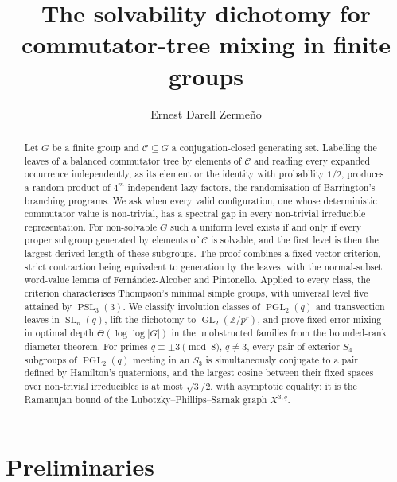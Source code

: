 \documentclass[11pt]{amsart}
\title[The solvability dichotomy for commutator-tree mixing]
{The solvability dichotomy for commutator-tree mixing in finite groups}
\author{Ernest Darell Zermeño}
\theoremstyle{definition}
\theoremstyle{remark}
\theoremstyle{plain}
\theoremstyle{plain}
\numberwithin{equation}{section}
\DeclareMathOperator{\GL}{GL}
\DeclareMathOperator{\SL}{SL}
\DeclareMathOperator{\PGL}{PGL}
\DeclareMathOperator{\PSL}{PSL}
\newcommand{\Z}{\mathbb{Z}}
\begin{document}
\begin{abstract}
Let $G$ be a finite group and $\mathcal C\subseteq G$ a
conjugation-closed generating set. Labelling the leaves of a balanced
commutator tree by elements of $\mathcal C$ and reading every expanded
occurrence independently, as its element or the identity with
probability $1/2$, produces a random product of $4^m$ independent lazy
factors, the randomisation of Barrington's branching programs. We ask
when every valid configuration, one whose deterministic commutator value
is non-trivial, has a spectral gap in every non-trivial irreducible
representation. For non-solvable $G$ such a uniform level exists if and
only if every proper subgroup generated by elements of $\mathcal C$ is
solvable, and the first level is then the largest derived length of
these subgroups. The proof combines a fixed-vector criterion, strict
contraction being equivalent to generation by the leaves, with the
normal-subset word-value lemma of Fern\'andez-Alcober and Pintonello.
Applied to every class, the criterion characterises Thompson's minimal
simple groups, with universal level five attained by $\PSL_3(3)$. We
classify involution classes of $\PGL_2(q)$ and transvection leaves in
$\SL_n(q)$, lift the dichotomy to $\GL_2(\Z/p^r)$, and prove fixed-error
mixing in optimal depth $\Theta(\log\log|G|)$ in the unobstructed
families from the bounded-rank diameter theorem. For primes
$q\equiv\pm3\pmod8$, $q\ne3$, every pair of exterior $S_4$ subgroups of
$\PGL_2(q)$ meeting in an $S_3$ is simultaneously conjugate to a pair
defined by Hamilton's quaternions, and the largest cosine between their
fixed spaces over non-trivial irreducibles is at most $\sqrt3/2$, with
asymptotic equality: it is the Ramanujan bound of the
Lubotzky--Phillips--Sarnak graph $X^{3,q}$.
\end{abstract}

\maketitle





\newpage
\section{Preliminaries}
\label{sec:prelim}
\end{document}
